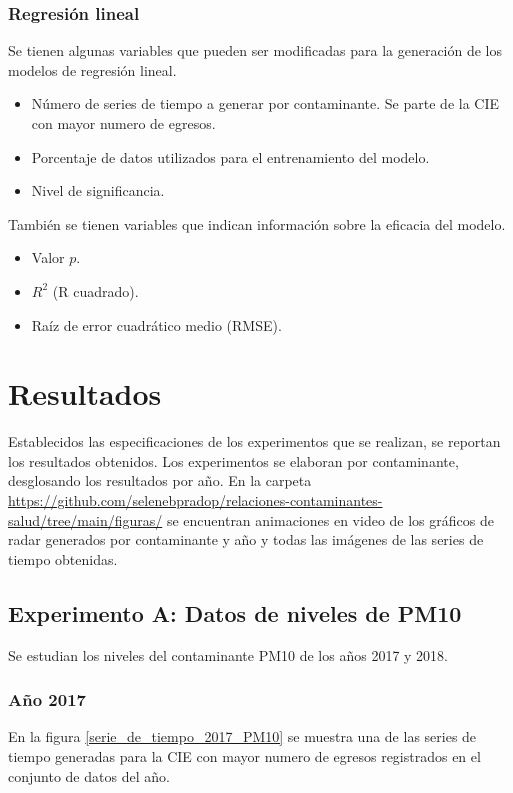 \subsubsection{Regresión lineal}
Se tienen algunas variables que pueden ser modificadas para la generación de los modelos de regresión lineal.

\begin{itemize}
	\item Número de series de tiempo a generar por contaminante. Se parte de la CIE \citep{r9} con mayor numero de egresos.
	\item Porcentaje de datos utilizados para el entrenamiento del modelo.
	\item Nivel de significancia.
\end{itemize}

También se tienen variables que indican información sobre la eficacia del modelo.

\begin{itemize}
	\item Valor $p$.
	\item $R^2$ (R cuadrado).
	\item Raíz de error cuadrático medio (RMSE).
\end{itemize}


\clearpage
\section{Resultados}
Establecidos las especificaciones de los experimentos que se realizan, se reportan los resultados obtenidos. Los experimentos se elaboran por contaminante, desglosando los resultados por año. En la carpeta \url{https://github.com/selenebpradop/relaciones-contaminantes-salud/tree/main/figuras/} se encuentran animaciones en video de los gráficos de radar generados por contaminante y año y todas las imágenes de las series de tiempo obtenidas.

\subsection{Experimento A: Datos de niveles de PM10}
Se estudian los niveles del contaminante PM10 de los años 2017 y 2018. 

\subsubsection{Año 2017}
En la figura \ref{serie_de_tiempo_2017_PM10} se muestra una de las series de tiempo generadas para la CIE \citep{r9} con mayor numero de egresos registrados en el conjunto de datos del año. 

